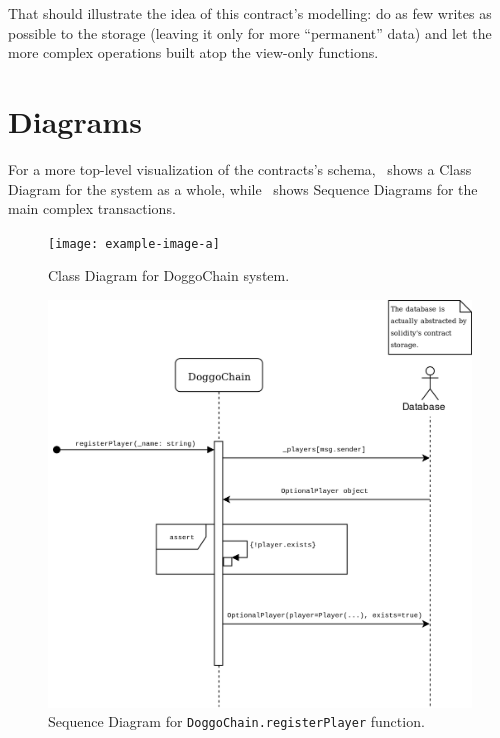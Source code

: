 \documentclass{article}
\begin{document}
    That should illustrate the idea of this contract's modelling: do as few
    writes as possible to the storage (leaving it only for more ``permanent''
    data) and let the more complex operations built atop the view-only
    functions.

    \section{Diagrams}

    For a more top-level visualization of the contracts's
    schema,~ shows a Class Diagram for the system as a
    whole, while~ shows Sequence
    Diagrams for the main complex transactions.

    \begin{figure}[h]
        \centering{}
        \texttt{[image: example-image-a]}
        \caption{Class Diagram for DoggoChain system.~\label{fig:class-diagram}}
    \end{figure}

    \begin{figure}[h]
        \centering{}
        \includegraphics[width=1\textwidth]{img/DoggoChain - registerPlayer SD}
        \caption{%
            Sequence Diagram for \texttt{DoggoChain.registerPlayer}
            function.~\label{fig:registerPlayerSD}
        }
    \end{figure}
\end{document}
